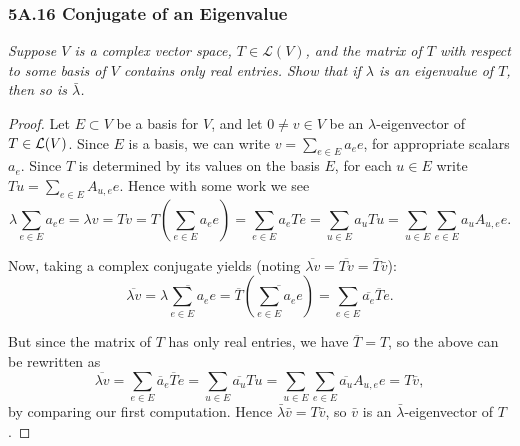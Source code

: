 \documentclass{article}
\begin{document}
\subsubsection*{5A.16 Conjugate of an Eigenvalue}
\textit{Suppose $V$ is a complex vector space, $T\in \mathcal L(V)$, and the matrix of $T$ with respect to some basis of $V$ contains only real entries. Show that if $\lambda$ is an eigenvalue of $T$, then so is $\bar\lambda$.}
\begin{proof}
Let $E\subset V$ be a basis for $V$, and let $0\neq v\in V$ be an $\lambda$-eigenvector of $T\in\mathcal L(V)$. Since $E$ is a basis, we can write $v = \displaystyle \sum_{e\in E} a_ee$, for appropriate scalars $a_e$. Since $T$ is determined by its values on the basis $E$, for each $u\in E$ write $Tu = \displaystyle\sum_{e\in E} A_{u, e}e$. Hence with some work we see
$$\lambda \sum_{e\in E}a_ee = \lambda v=Tv = T\left(\sum_{e\in E} a_ee\right) = \sum_{e\in E} a_e Te = \sum_{u\in E}a_uTu = \sum_{u\in E}\sum _{e\in E} a_uA_{u,e}e.$$

Now, taking a complex conjugate yields (noting $\overline{ \lambda v} = \overline{Tv} = \bar T\bar v$):
$$\overline{\lambda v} = \overline{\lambda\sum_{e\in E} a_ee} = \overline T\left( \overline{\sum_{e\in E}a_ee}\right) = \sum_{e\in E}\overline{a_e} \overline Te.$$

But since the matrix of $T$ has only real entries, we have $\overline T = T$, so the above can be rewritten as
$$\overline{\lambda v} = \sum_{e\in E}\overline a_e\overline Te = \sum_{u\in E}\overline{a_u}Tu = \sum_{u\in E}\sum _{e\in E} \overline {a_u}A_{u,e}e = T\overline v,$$
by comparing our first computation. Hence $\bar\lambda \bar v = T\bar v$, so $\bar v$ is an $\bar\lambda$-eigenvector of $T$.
\end{proof}
\newpage
\end{document}
